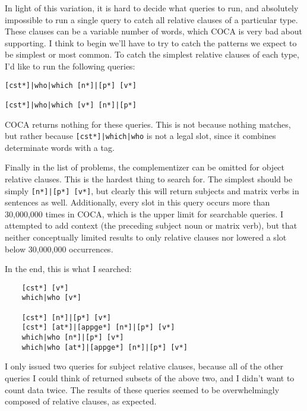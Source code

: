 \documentclass[doc,12pt]{apa6}
\begin{document}
In light of this variation, it is hard to decide what queries to run, and
absolutely impossible to run a single query to catch all relative clauses of a
particular type. These clauses can be a variable number of words, which COCA is
very bad about supporting. I think to begin we'll have to try to catch the
patterns we expect to be simplest or most common.  To catch the simplest
relative clauses of each type, I'd like to run the following queries:
\begin{verbatim}
[cst*]|who|which [n*]|[p*] [v*]

[cst*]|who|which [v*] [n*]|[p*]
\end{verbatim}
COCA returns nothing for these queries. This is not because nothing matches,
but rather because \texttt{{[}cst*{]}{|}which{|}who} is not a legal slot, since
it combines determinate words with a tag.

Finally in the list of problems, the complementizer can be omitted for object 
relative clauses. This is the hardest thing to search for. The simplest should
be simply \texttt{{[}n*{]}|{[}p*{]} {[}v*{]}}, but clearly this will return
subjects and matrix verbs in sentences as well. Additionally, every slot in
this query occurs more than 30,000,000 times in COCA, which is the upper limit
for searchable queries. I attempted to add context (the preceding subject noun
or matrix verb), but that neither conceptually limited results to only relative
clauses nor lowered a slot below 30,000,000 occurrences.



In the end, this is what I searched:
\begin{verbatim}
	[cst*] [v*]
	which|who [v*]

	[cst*] [n*]|[p*] [v*]
	[cst*] [at*]|[appge*] [n*]|[p*] [v*]
	which|who [n*]|[p*] [v*]
	which|who [at*]|[appge*] [n*]|[p*] [v*]
\end{verbatim}
I only issued two queries for subject relative clauses, because all of the
other queries I could think of returned subsets of the above two, and I didn't
want to count data twice. The results of these queries seemed to be
overwhelmingly composed of relative clauses, as expected.
\end{document}
